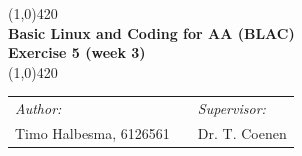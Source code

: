 \documentclass[a4paper]{article}
\begin{document}
\begin{center}
\line(1,0){420} \\
\huge \textbf{Basic Linux and Coding for AA (BLAC) \\ Exercise 5 (week 3)} \\
\line(1,0){420}
\end{center}

\vfill



\begin{table}[h]
\begin{center}
\begin{tabular}{lp{5cm}l}
\textit{Author:} & & \emph{Supervisor:} \\
Timo Halbesma, 6126561 & & Dr. T. Coenen\\
\end{tabular}
\end{center}
\end{table}


\newpage
\end{document}
